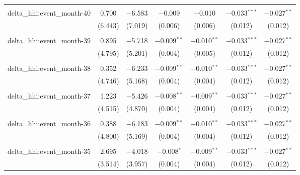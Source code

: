 \begin{table}[H]
{\begin{tabular}{@{\extracolsep{5pt}}lcccccc}
   & & & & & & \\  

  delta\_hhi:event\_month-40 & 0.700 & $-$6.583 & $-$0.009 & $-$0.010 & $-$0.033$^{***}$ & $-$0.027$^{**}$ \\  

   & (6.443) & (7.019) & (0.006) & (0.006) & (0.012) & (0.012) \\  

   & & & & & & \\  

  delta\_hhi:event\_month-39 & 0.895 & $-$5.718 & $-$0.009$^{**}$ & $-$0.010$^{**}$ & $-$0.033$^{***}$ & $-$0.027$^{**}$ \\  

   & (4.795) & (5.201) & (0.004) & (0.005) & (0.012) & (0.012) \\  

   & & & & & & \\  

  delta\_hhi:event\_month-38 & 0.352 & $-$6.233 & $-$0.009$^{**}$ & $-$0.010$^{**}$ & $-$0.033$^{***}$ & $-$0.027$^{**}$ \\  

   & (4.746) & (5.168) & (0.004) & (0.004) & (0.012) & (0.012) \\  

   & & & & & & \\  

  delta\_hhi:event\_month-37 & 1.223 & $-$5.426 & $-$0.008$^{**}$ & $-$0.009$^{**}$ & $-$0.033$^{***}$ & $-$0.027$^{**}$ \\  

   & (4.515) & (4.870) & (0.004) & (0.004) & (0.012) & (0.012) \\  

   & & & & & & \\  

  delta\_hhi:event\_month-36 & 0.388 & $-$6.183 & $-$0.009$^{**}$ & $-$0.010$^{**}$ & $-$0.033$^{***}$ & $-$0.027$^{**}$ \\  

   & (4.800) & (5.169) & (0.004) & (0.004) & (0.012) & (0.012) \\  

   & & & & & & \\  

  delta\_hhi:event\_month-35 & 2.695 & $-$4.018 & $-$0.008$^{*}$ & $-$0.009$^{**}$ & $-$0.033$^{***}$ & $-$0.027$^{**}$ \\  

   & (3.514) & (3.957) & (0.004) & (0.004) & (0.012) & (0.012) \\  


\end{tabular}}
\end{table}
